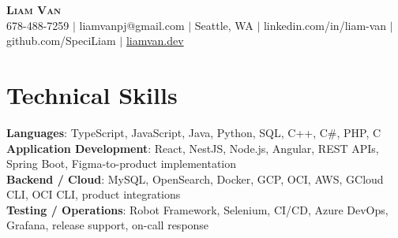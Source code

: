 \documentclass[letterpaper,11pt]{article}
\begin{document}

%
\begin{center}
    \textbf{\Huge \scshape Liam Van} \\ \vspace{1pt}
    \small 678-488-7259 $|$ liamvanpj@gmail.com $|$ Seattle, WA $|$
    linkedin.com/in/liam-van $|$ github.com/SpeciLiam $|$ \href{https://liamvan.dev}{liamvan.dev}

\end{center}

\section{Technical Skills}
 \begin{itemize}[leftmargin=0.15in, label={}]
    \small{\item{
     \textbf{Languages}{: TypeScript, JavaScript, Java, Python, SQL, C++, C\#, PHP, C} \\
     \textbf{Application Development}{: React, NestJS, Node.js, Angular, REST APIs, Spring Boot, Figma-to-product implementation} \\
     \textbf{Backend / Cloud}{: MySQL, OpenSearch, Docker, GCP, OCI, AWS, GCloud CLI, OCI CLI, product integrations} \\
     \textbf{Testing / Operations}{: Robot Framework, Selenium, CI/CD, Azure DevOps, Grafana, release support, on-call response} \\
    }}
 \end{itemize}
%

\end{document}
